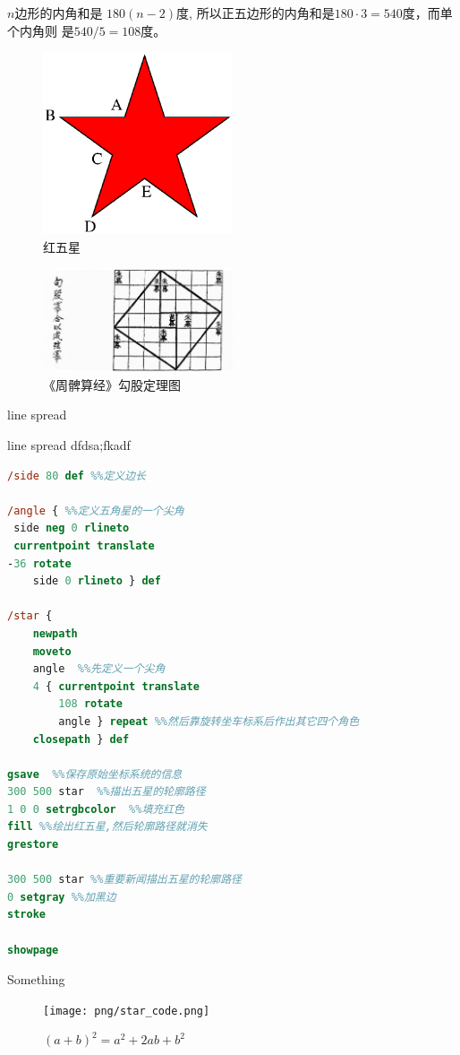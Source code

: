 \documentclass[main.tex]{subfiles}
\begin{document}
\begin{example} $n$边形的内角和是 $180(n-2)$度, 所以正五边形的内角和是$180\cdot 3 = 540$度，而单个内角则 是$540/5 = 108$度。
\end{example}

\begin{figure}[h]
	\centering
	\includegraphics[width=0.5\textwidth]{images/star.eps}
	\caption{红五星}
	\label{fig:III.1.2}
\end{figure}

\begin{figure}[h]
	\centering
	\includegraphics[width=0.5\textwidth]{images/ps/ch_gougu.jpg}
	\caption{《周髀算经》勾股定理图}
	\label{fig:III.1.3}
\end{figure}

line spread

line spread
dfdsa;fkadf

\begin{lstlisting}[language=PostScript]
%!PS
/side 80 def %%定义边长 

/angle { %%定义五角星的一个尖角   
 side neg 0 rlineto
 currentpoint translate
-36 rotate
	side 0 rlineto } def

/star {
	newpath
	moveto
	angle  %%先定义一个尖角
	4 { currentpoint translate
		108 rotate
		angle } repeat %%然后靠旋转坐车标系后作出其它四个角色
	closepath } def

gsave  %%保存原始坐标系统的信息
300 500 star  %%描出五星的轮廓路径
1 0 0 setrgbcolor  %%填充红色
fill %%绘出红五星,然后轮廓路径就消失
grestore

300 500 star %%重要新闻描出五星的轮廓路径
0 setgray %%加黑边
stroke

showpage
\end{lstlisting}




Something
\begin{figure}[h]
	\centering
	\texttt{[image: png/star\_code.png]}
	\caption{$(a+b)^2 = a^2 + 2ab + b^2$}
	\label{fig:III.1.3}
\end{figure}
\end{document}

